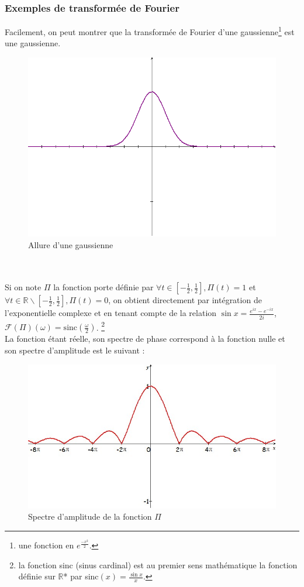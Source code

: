 \subsubsection{Exemples de transformée de Fourier}

Facilement, on peut montrer que la transformée de Fourier d'une gaussienne\footnote{une fonction en $e^{\frac{-x^2}{2}}$.} est une gaussienne.
\begin{figure}[!h]
\centering
\includegraphics[scale=0.3]{gaussienne.png}
\caption{Allure d'une gaussienne}
\end{figure} \\ \\

Si on note $\Pi$ la fonction porte définie par 
$\forall t\in \left[-\frac{1}{2},\frac{1}{2} \right],\Pi(t)=1$ et $\forall t\in \mathbb{R} \backslash \left[-\frac{1}{2},\frac{1}{2} \right],\Pi(t)=0$, on obtient directement par intégration de l'exponentielle complexe et en tenant compte de la relation $\sin x = \displaystyle\frac{e^{ix}-e^{-ix}}{2i}$,
$\mathcal{F}(\Pi)(\omega) = \mathrm{sinc}(\frac{\omega}{2})$.  \footnote{la fonction sinc (sinus cardinal) est au premier sens mathématique la fonction définie sur $\mathbb{R}$* par sinc$(x)=\frac{\sin x}{x}$.} \\ La fonction étant réelle, son spectre de phase correspond à la fonction nulle et son spectre d'amplitude est le suivant : 
\begin{figure}[!h]
\centering
\includegraphics[scale=0.5]{sinc.jpg}
\caption{Spectre d'amplitude de la fonction $\Pi$}
\end{figure}


